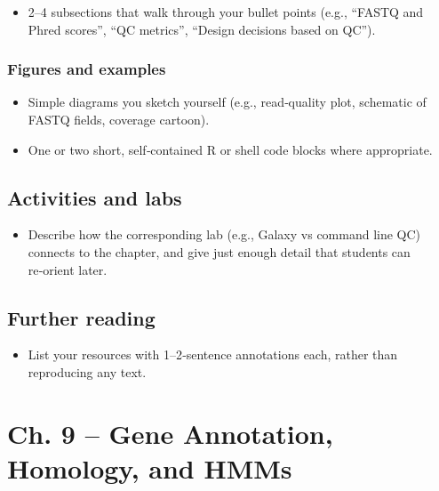 \documentclass[
  letterpaper,
  DIV=11,
  numbers=noendperiod]{scrreprt}
\providecommand{\tightlist}{%
  \setlength{\itemsep}{0pt}\setlength{\parskip}{0pt}}
\begin{document}
\begin{itemize}
\tightlist
\item
  2--4 subsections that walk through your bullet points (e.g., ``FASTQ
  and Phred scores'', ``QC metrics'', ``Design decisions based on QC'').
\end{itemize}

\subsection{Figures and examples}\label{figures-and-examples-4}

\begin{itemize}
\tightlist
\item
  Simple diagrams you sketch yourself (e.g., read‑quality plot,
  schematic of FASTQ fields, coverage cartoon).
\item
  One or two short, self‑contained R or shell code blocks where
  appropriate.
\end{itemize}

\section{Activities and labs}\label{activities-and-labs-4}

\begin{itemize}
\tightlist
\item
  Describe how the corresponding lab (e.g., Galaxy vs command line QC)
  connects to the chapter, and give just enough detail that students can
  re‑orient later.
\end{itemize}

\section{Further reading}\label{further-reading-4}

\begin{itemize}
\tightlist
\item
  List your resources with 1--2‑sentence annotations each, rather than
  reproducing any text.
\end{itemize}


\chapter{Ch. 9 -- Gene Annotation, Homology, and
HMMs}\label{ch.-9-gene-annotation-homology-and-hmms}
\end{document}
